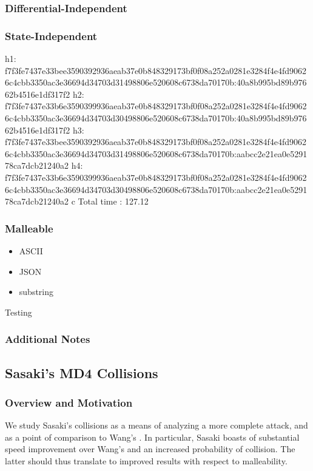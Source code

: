 \documentclass[letterpaper,twocolumn,10pt]{article}
\begin{document}
\subsubsection{Differential-Independent}
\subsubsection{State-Independent}
h1: f7f3fe7437e33bee3590392936aeab37e0b848329173bf0f08a252a0281e3284f4e4fd90626c4cbb3350ac3e36694d34703d31498806e520608c6738da70170b:40a8b995bd89b97662b4516e1df317f2
h2: f7f3fe7437e33b6e3590399936aeab37e0b848329173bf0f08a252a0281e3284f4e4fd90626c4cbb3350ac3e36694d34703d30498806e520608c6738da70170b:40a8b995bd89b97662b4516e1df317f2
h3: f7f3fe7437e33bee3590392936aeab37e0b848329173bf0f08a252a0281e3284f4e4fd90626c4cbb3350ac3e36694d34703d31498806e520608c6738da70170b:aabcc2e21ea0e529178ca7dcb21240a2
h4: f7f3fe7437e33b6e3590399936aeab37e0b848329173bf0f08a252a0281e3284f4e4fd90626c4cbb3350ac3e36694d34703d30498806e520608c6738da70170b:aabcc2e21ea0e529178ca7dcb21240a2
c Total time               : 127.12

\subsubsection{Malleable}
\begin{itemize}
    \item ASCII
    \item JSON
    \item substring
\end{itemize}
Testing
\subsubsection{Additional Notes}

\subsection{Sasaki's MD4 Collisions}
\subsubsection{Overview and Motivation}
We study Sasaki's collisions as a means of analyzing a more complete attack,
and as a point of comparison to Wang's \cite{Sasaki2007}. In particular, Sasaki boasts
of substantial speed improvement over Wang's and an increased probability of
collision. The latter should thus translate to improved results with respect to
malleability.
\end{document}
